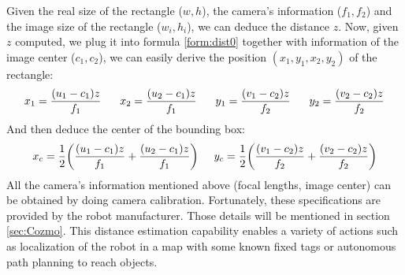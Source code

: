 Given the real size of the rectangle ($w, h$), the camera's information ($f_1, f_2$) and the image size of the rectangle ($w_i, h_i$), we can deduce the distance $z$. Now, given $z$ computed, we plug it into formula \ref{form:dist0} together with information of the image center ($c_1, c_2$), we can easily derive the position $(x_1, y_1, x_2, y_2)$ of the rectangle:
\begin{align}
	x_1 = \frac{(u_1 - c_1)z}{f_1} \hspace{0.6cm}
	x_2 = \frac{(u_2 - c_1)z}{f_1} \hspace{0.6cm}
	y_1 = \frac{(v_1 - c_2)z}{f_2} \hspace{0.6cm}
	y_2 = \frac{(v_2 - c_2)z}{f_2} 
\end{align}
And then deduce the center of the bounding box:
\begin{align}
x_c = \frac{1}{2}\bigg(\frac{(u_1 - c_1)z}{f_1} + \frac{(u_2 - c_1)z}{f_1} \bigg) \hspace{0.5cm} y_c = \frac{1}{2}\bigg( \frac{(v_1 - c_2)z}{f_2} + \frac{(v_2 - c_2)z}{f_2} \bigg)
\end{align}
All the camera's information mentioned above (focal lengths, image center) can be obtained by doing camera calibration. Fortunately, these specifications are provided by the robot manufacturer. Those details will be mentioned in section \ref{sec:Cozmo}.
This distance estimation capability enables a variety of actions such as localization of the robot in a map with some known fixed tags or autonomous path planning to reach objects.